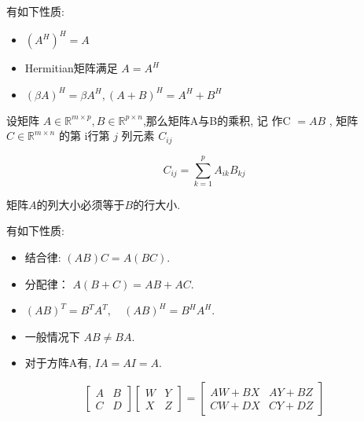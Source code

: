 \begin{corollary}[共轭转置的性质]
    有如下性质:
    \begin{itemize}
        \item $ \left(A^{H}\right)^{H}=A $
        \item Hermitian矩阵满足 $ A=A^{H} $
        \item $ (\beta A)^{H}=\beta A^{H},(A+B)^{H}=A^{H}+B^{H} $
    \end{itemize}
\end{corollary}


\begin{definition}[矩阵乘法]
    设矩阵 $ A \in \mathbb{R}^{m \times p}, B \in \mathbb{R}^{p \times n} $,那么矩阵A与B的乘积, 记 作C $ =A B $ ,  矩阵 $ C \in \mathbb{R}^{m \times n} $ 的第 i行第 $ j $ 列元素 $ C_{i j} $

    $$
{C}_{i j}=\sum_{k=1}^{p} A_{i k} B_{k j}
$$

\end{definition}

\begin{remark}
    矩阵$A$的列大小必须等于$B$的行大小.
\end{remark} 

\begin{corollary}[矩阵乘法性质]
    有如下性质:
    \begin{itemize}
        \item 结合律: $ (A B) C=A(B C) $.
        \item 分配律： $ A(B+C)=A B+A C $.
        \item $ (A B)^{T}=B^{T} A^{T}, \quad(A B)^{{H}}=B^{H} A^{H} $.
        \item 一般情况下 $ A B \neq B A $.
        \item 对于方阵A有, $ I A=A I=A $.
    \end{itemize} 
\end{corollary}

\begin{definition}[分块矩阵乘法]
    $$ \left[\begin{array}{ll}A & B \\ {C} & D\end{array}\right]\left[\begin{array}{ll}W & Y \\ X & Z\end{array}\right]=\left[\begin{array}{ll}A W+B X & A Y+B Z \\ C W+D X & C Y+D Z\end{array}\right] $$
\end{definition}


